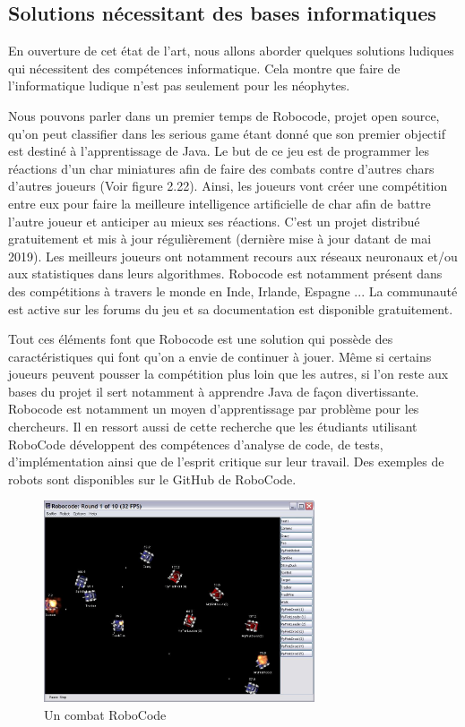 \newpage

\subsection{Solutions nécessitant des bases informatiques}

En ouverture de cet état de l'art, nous allons aborder quelques solutions ludiques qui nécessitent des compétences informatique. Cela montre que faire de l'informatique ludique n'est pas seulement pour les néophytes.

Nous pouvons parler dans un premier temps de Robocode, projet open source, \cite{49} qu'on peut classifier dans les serious game étant donné que son premier objectif est destiné à l'apprentissage de Java. Le but de ce jeu est de programmer les réactions d'un char miniatures afin de faire des combats contre d'autres chars d'autres joueurs (Voir figure 2.22). Ainsi, les joueurs vont créer une compétition entre eux pour faire la meilleure intelligence artificielle de char afin de battre l'autre joueur et anticiper au mieux ses réactions. C'est un projet distribué gratuitement et mis à jour régulièrement (dernière mise à jour datant de mai 2019). Les meilleurs joueurs ont notamment recours aux réseaux neuronaux et/ou aux statistiques dans leurs algorithmes. Robocode est notamment présent dans des compétitions à travers le monde en Inde, Irlande, Espagne ... La communauté est active sur les forums du jeu et sa documentation est disponible gratuitement.

Tout ces éléments font que Robocode est une solution qui possède des caractéristiques qui font qu'on a envie de continuer à jouer. Même si certains joueurs peuvent pousser la compétition plus loin que les autres, si l'on reste aux bases du projet il sert notamment à apprendre Java de façon divertissante. Robocode est notamment un moyen d'apprentissage par problème pour les chercheurs. \cite{50} Il en ressort aussi de cette recherche que les étudiants utilisant RoboCode développent des compétences d'analyse de code, de tests, d'implémentation ainsi que de l'esprit critique sur leur travail. Des exemples de robots sont disponibles sur le GitHub de RoboCode. \cite{51}

\begin{figure}[!htb]
  \centering
  \includegraphics[width=80mm,scale=0.5]{images/robocode.jpg}
  \caption{Un combat RoboCode}
  \label{fig:boat1}
\end{figure}

